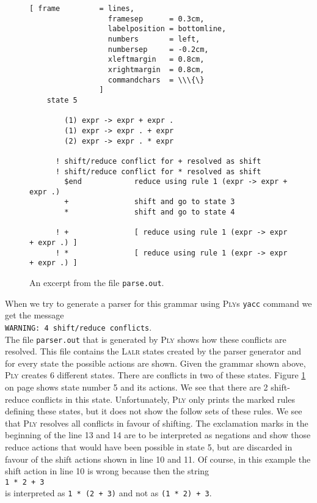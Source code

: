 \begin{figure}[!ht]
\centering
\begin{Verbatim}[ frame         = lines, 
                  framesep      = 0.3cm, 
                  labelposition = bottomline,
                  numbers       = left,
                  numbersep     = -0.2cm,
                  xleftmargin   = 0.8cm,
                  xrightmargin  = 0.8cm,
                  commandchars  = \\\{\}
                ]
    state 5
    
        (1) expr -> expr + expr .
        (1) expr -> expr . + expr
        (2) expr -> expr . * expr
    
      ! shift/reduce conflict for + resolved as shift
      ! shift/reduce conflict for * resolved as shift
        $end            reduce using rule 1 (expr -> expr + expr .)
        +               shift and go to state 3
        *               shift and go to state 4
    
      ! +               [ reduce using rule 1 (expr -> expr + expr .) ]
      ! *               [ reduce using rule 1 (expr -> expr + expr .) ]
\end{Verbatim} 
\vspace*{-0.3cm}
\caption{An excerpt from the file \texttt{parse.out}.}
\label{fig:Conflicts.ipynb:state10}
\end{figure} %

When we try to generate a parser for this grammar using \textsc{Ply}s \texttt{yacc} command we get the message
\\[0.2cm]
\hspace*{1.3cm}
\texttt{WARNING: 4 shift/reduce conflicts}.
\\[0.2cm]
The file \texttt{parser.out} that is generated by \textsc{Ply} shows how these conflicts are resolved.
This file contains the \textsc{Lalr} states created by the parser generator and for every state the possible actions are
shown.  Given the grammar shown above, \textsc{Ply} creates 6 different states.  There are conflicts in two of
these states.  Figure \ref{fig:Conflicts.ipynb:state10} on page \pageref{fig:Conflicts.ipynb:state10} shows state
number 5 and its actions.   We see that there are 2 shift-reduce conflicts in this state.  Unfortunately,
\textsc{Ply} only prints the marked rules defining these states, but it does not show the follow sets of these
rules.  We see that \textsc{Ply} resolves all conflicts in favour of shifting.  The exclamation marks in the
beginning of the line 13 and 14 are to be interpreted as negations and show those reduce actions that would have
been possible in state 5, but are discarded in favour of the shift actions shown in line 10 and 11.
Of course, in this example the shift action in line 10 is wrong because then the string
\\[0.2cm]
\hspace*{1.3cm}
\texttt{1 * 2 + 3}
\\[0.2cm]
is interpreted as \texttt{1 * (2 + 3)} and not as \texttt{(1 * 2) + 3}.
\FloatBarrier


